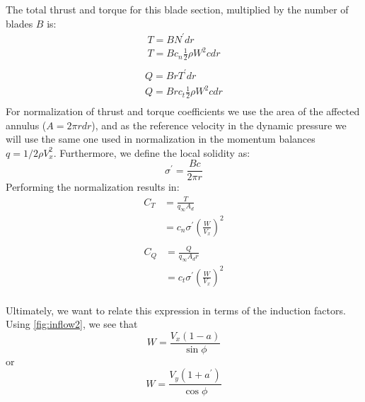 The total thrust and torque for this blade section, multiplied by the number of blades $B$ is:
\begin{equation}
    \begin{aligned}
        T = B N^\prime dr\\
        T = B c_n \frac{1}{2}\rho W^2 c dr\\
    \end{aligned}
    \label{eq:beT}
\end{equation}
\begin{equation}
    \begin{aligned}
        Q = B r T^\prime dr\\
        Q = B r c_t \frac{1}{2}\rho W^2 c dr\\
    \end{aligned}
    \label{eq:beQ}
\end{equation}
For normalization of thrust and torque coefficients we use the area of the affected annulus ($A = 2 \pi r dr$), and as the reference velocity in the dynamic pressure we will use the same one used in normalization in the momentum balances $q = 1/2 \rho V_x^2$.  Furthermore, we define the local solidity as:
\begin{equation}
    \sigma^\prime = \frac{B c}{2 \pi r}
\end{equation}
Performing the normalization results in:
\begin{equation}
    \begin{aligned}
        C_T &= \frac{T}{q_\infty A_d}\\
         &= c_n \sigma^\prime \left(\frac{W}{V_x}\right)^2\\
     \end{aligned}
 \end{equation}
 \begin{equation}
     \begin{aligned}
        C_Q &= \frac{Q}{q_\infty A_d r}\\
         &= c_t \sigma^\prime \left(\frac{W}{V_x}\right)^2\\
    \end{aligned}
\end{equation}

Ultimately, we want to relate this expression in terms of the induction factors.  Using \cref{fig:inflow2}, we see that
\begin{equation}
    W = \frac{V_x (1 - a)}{\sin \phi}
\end{equation}
or
\begin{equation}
    W = \frac{V_y (1 + a^\prime)}{\cos \phi}
\end{equation}

